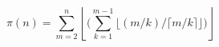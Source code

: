 $$
    \pi(n) = \sum_{m=2}^n \left\lfloor \bigg( \sum_{k=1}^{m-1} \big\lfloor (m/k) / \lceil m/k \rceil \big\rfloor \bigg)\right\rfloor
$$
\bye
